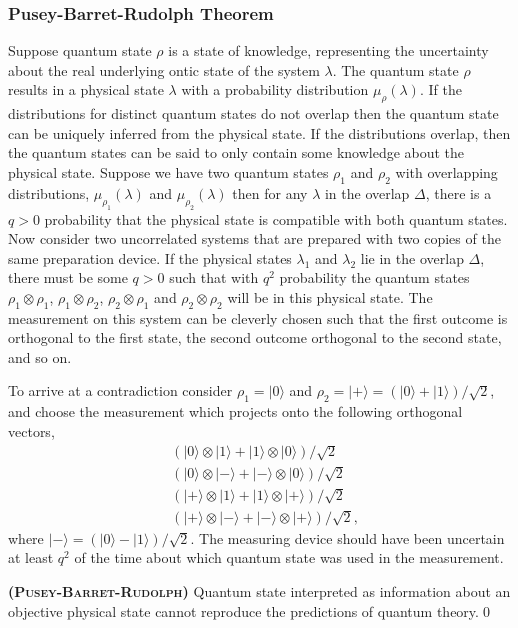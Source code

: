 \documentclass[11pt]{report}
\begin{document}
\subsubsection{{Pusey-Barret-Rudolph Theorem}}
Suppose quantum state $\rho$ is a state of knowledge, representing the uncertainty about the real underlying ontic state of the system $\lambda$. The quantum state $\rho$ results in a physical state $\lambda$ with a probability distribution $\mu_\rho(\lambda)$. If the distributions for distinct quantum states do not overlap then the quantum state can be uniquely inferred from the physical state. If the distributions overlap, then the quantum states can be said to only contain some knowledge about the physical state. Suppose we have two quantum states $\rho_1 $ and $\rho_2$ with overlapping distributions, $\mu_{\rho_1}(\lambda)$ and $\mu_{\rho_2}(\lambda)$ then for any $\lambda$ in the overlap $\Delta$, there is a $q>0$ probability that the physical state is compatible with both quantum states. Now consider two uncorrelated systems that are prepared with two copies of the same preparation device. If the physical states $\lambda_1$ and $\lambda_2$ lie in the overlap $\Delta$, there must be some $q>0$ such that with $q^2$ probability the quantum states $\rho_1\otimes \rho_1$, $\rho_1\otimes \rho_2$, $\rho_2\otimes \rho_1$ and $\rho_2\otimes \rho_2$ will be in this physical state. The measurement on this system can be cleverly chosen such that the first outcome is orthogonal to the first state, the second outcome orthogonal to the second state, and so on.

To arrive at a contradiction consider $\rho_1=|0\rangle$ and $\rho_2=|+\rangle=(|0\rangle+|1\rangle)/\sqrt 2$, and choose the measurement which projects onto the following orthogonal vectors,
\begin{align*}
	&(|0\rangle\otimes |1\rangle+|1\rangle\otimes|0\rangle)/\sqrt 2\\
	&(|0\rangle\otimes|-\rangle+|-\rangle\otimes|0\rangle)/\sqrt 2\\
	&(|+\rangle\otimes|1\rangle+|1\rangle\otimes|+\rangle)/\sqrt 2\\
	&(|+\rangle\otimes|-\rangle+|-\rangle\otimes|+\rangle)/\sqrt 2,
\end{align*}
where $|-\rangle=(|0\rangle-|1\rangle)/\sqrt 2$.
The measuring device should have been uncertain at least $q^2$ of the time about which quantum state was used in the measurement. 

\vspace{1em}
\begin{theorem}
	{\bfseries{\textsc{(Pusey-Barret-Rudolph)}}} Quantum state interpreted as information about an objective physical state cannot reproduce the predictions of quantum theory.\qed
\end{theorem}
\vspace{1em}
\end{document}
